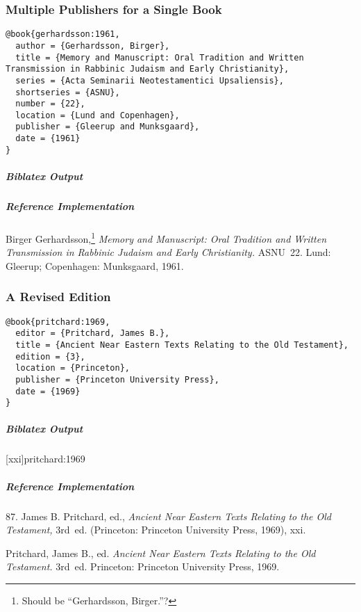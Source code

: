 \documentclass[a4paper]{article}
\newenvironment{biboutput}{%
  \subparagraph{Biblatex Output}
}{\color{black}}
\newenvironment{refimp}{%
  \subparagraph{Reference Implementation}
  \color{reference-colour}
  \rm
}{\par\color{black}}
\begin{document}
\subsubsection{Multiple Publishers for a Single Book}

\begin{lstlisting}
@book{gerhardsson:1961,
  author = {Gerhardsson, Birger},
  title = {Memory and Manuscript: Oral Tradition and Written Transmission in Rabbinic Judaism and Early Christianity},
  series = {Acta Seminarii Neotestamentici Upsaliensis},
  shortseries = {ASNU},
  number = {22},
  location = {Lund and Copenhagen},
  publisher = {Gleerup and Munksgaard},
  date = {1961}
}
\end{lstlisting}

\begin{biboutput}
\end{biboutput}

\begin{refimp}
  \hangindent\bibindent Birger Gerhardsson,\footnote{Should be “Gerhardsson,
  Birger.”?} \emph{Memory and Manuscript: Oral Tradition and Written
  Transmission in Rabbinic Judaism and Early Christianity.} ASNU~22. Lund:
  Gleerup; Copenhagen: Munksgaard, 1961.

\end{refimp}

\subsubsection{A Revised Edition}

\begin{lstlisting}
@book{pritchard:1969,
  editor = {Pritchard, James B.},
  title = {Ancient Near Eastern Texts Relating to the Old Testament},
  edition = {3},
  location = {Princeton},
  publisher = {Princeton University Press},
  date = {1969}
}
\end{lstlisting}  

\begin{biboutput}
  [xxi]{pritchard:1969}
\end{biboutput}

\begin{refimp}
  \hspace*{\bibindent}87. James B. Pritchard, ed., \emph{Ancient Near Eastern
  Texts Relating to the Old Testament,} 3rd~ed. (Princeton: Princeton
  University Press, 1969), xxi.

  \hangindent\bibindent Pritchard, James B., ed. \emph{Ancient Near Eastern
  Texts Relating to the Old Testament.} 3rd~ed. Princeton: Princeton
  University Press, 1969.
\end{refimp}
\end{document}
